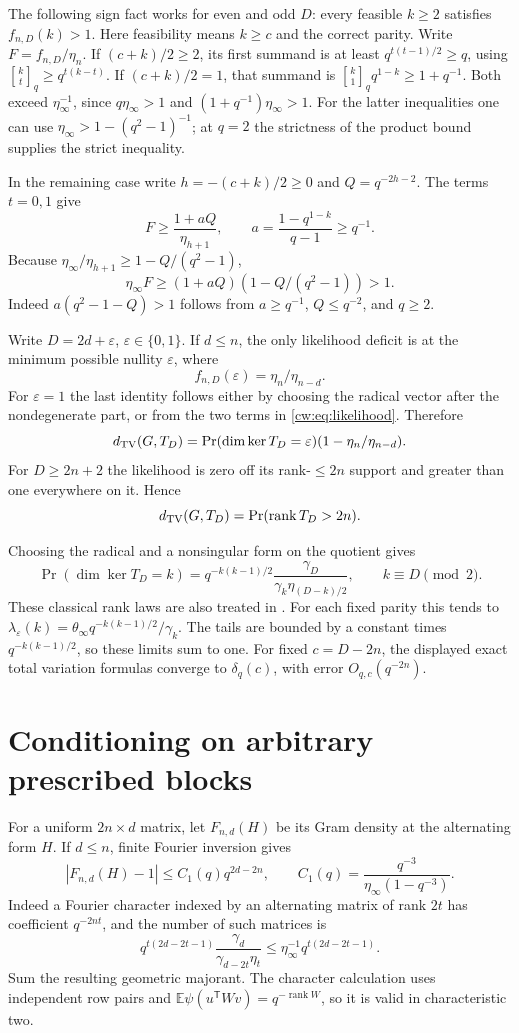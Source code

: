 \documentclass[11pt,letterpaper]{article}
\newcommand{\qbinom}[2]{\genfrac{[}{]}{0pt}{}{#1}{#2}_q}
\begin{document}
The following sign fact works for even and odd $D$:
every feasible $k\ge2$ satisfies $f_{n,D}(k)>1$.
Here feasibility means $k\ge c$ and the correct parity.
Write $F=f_{n,D}/\eta_n$. If $(c+k)/2\ge2$, its first summand is at least
$q^{t(t-1)/2}\ge q$, using $\qbinom{k}{t}\ge q^{t(k-t)}$.
If $(c+k)/2=1$, that summand is
$\qbinom{k}{1} q^{1-k}\ge1+q^{-1}$.
Both exceed $\eta_\infty^{-1}$, since
$q\eta_\infty>1$ and $(1+q^{-1})\eta_\infty>1$.
For the latter inequalities one can use
$\eta_\infty>1-(q^2-1)^{-1}$; at $q=2$ the strictness of the product
bound supplies the strict inequality.

In the remaining case write $h=-(c+k)/2\ge0$ and $Q=q^{-2h-2}$.
The terms $t=0,1$ give
\[
 F\ge\frac{1+aQ}{\eta_{h+1}},\qquad
 a=\frac{1-q^{1-k}}{q-1}\ge q^{-1}.
\]
Because $\eta_\infty/\eta_{h+1}\ge1-Q/(q^2-1)$,
\[
 \eta_\infty F
 \ge(1+aQ)(1-Q/(q^2-1))>1.
\]
Indeed $a(q^2-1-Q)>1$ follows from $a\ge q^{-1}$,
$Q\le q^{-2}$, and $q\ge2$.

Write $D=2d+\varepsilon$, $\varepsilon\in\{0,1\}$.
If $d\le n$, the only likelihood deficit is at the minimum possible
nullity $\varepsilon$, where
\[
 f_{n,D}(\varepsilon)=\eta_n/\eta_{n-d}.
\]
For $\varepsilon=1$ the last identity follows either by choosing the
radical vector after the nondegenerate part, or from the two terms in
\eqref{cw:eq:likelihood}. Therefore
\[
 d_{\rm TV}(G,T_D)
  =\Pr(\dim\ker T_D=\varepsilon)
      (1-\eta_n/\eta_{n-d}).
\]
For $D\ge2n+2$ the likelihood is zero off its rank-$\le2n$ support
and greater than one everywhere on it. Hence
\[
 d_{\rm TV}(G,T_D)=\Pr(\operatorname{rank}T_D>2n).
\]

Choosing the radical and a nonsingular form on the quotient gives
\[
 \Pr(\dim\ker T_D=k)
 =q^{-k(k-1)/2}\frac{\gamma_D}
  {\gamma_k\eta_{(D-k)/2}},\qquad k\equiv D\pmod2.
\]
These classical rank laws are also treated in \cite{FulmanGoldstein}.
For each fixed parity this tends to
$\lambda_\varepsilon(k)=\theta_\infty q^{-k(k-1)/2}/\gamma_k$.
The tails are bounded by a constant times $q^{-k(k-1)/2}$, so these
limits sum to one. For fixed $c=D-2n$, the displayed exact total
variation formulas converge to $\delta_q(c)$, with error
$O_{q,c}(q^{-2n})$.

\section{Conditioning on arbitrary prescribed blocks}

For a uniform $2n\times d$ matrix, let $F_{n,d}(H)$ be its Gram density
at the alternating form $H$. If $d\le n$, finite Fourier inversion gives
\begin{equation}\label{cw:eq:small-block}
 |F_{n,d}(H)-1|\le C_1(q)q^{2d-2n},\qquad
 C_1(q)=\frac{q^{-3}}{\eta_\infty(1-q^{-3})}.
\end{equation}
Indeed a Fourier character indexed by an alternating matrix of rank $2t$
has coefficient $q^{-2nt}$, and the number of such matrices is
\[
 q^{t(2d-2t-1)}\frac{\gamma_d}{\gamma_{d-2t}\eta_t}
 \le\eta_\infty^{-1}q^{t(2d-2t-1)}.
\]
Sum the resulting geometric majorant. The character calculation uses
independent row pairs and $\mathbb E\psi(u^{\mathsf T}Wv)=q^{-\operatorname{rank}W}$,
so it is valid in characteristic two.
\end{document}
